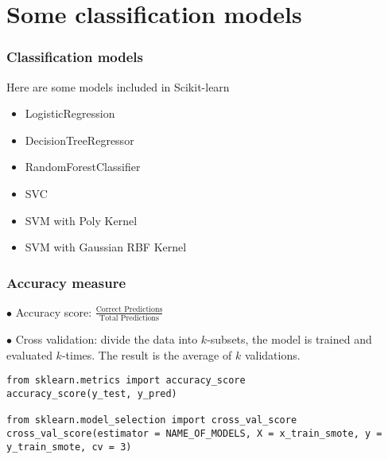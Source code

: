 \documentclass[10pt]{beamer}
\theoremstyle{definition}
\theoremstyle{remark}
\numberwithin{equation}{section}
\begin{document}
\section{Some classification models}
\begin{frame}
\frametitle{Classification models}

Here are some models included in Scikit-learn

\begin{itemize}
	\item LogisticRegression
	
	\item DecisionTreeRegressor
	
	\item RandomForestClassifier
	
	\item SVC
	
	\item SVM with Poly Kernel
	
	\item SVM with Gaussian RBF Kernel
\end{itemize}
\end{frame}

\begin{frame}[fragile]
	\frametitle{Accuracy measure}
	
	$\bullet$ Accuracy score: $\frac{\text{Correct Predictions}}{\text{Total Predictions}}$
	
	$\bullet$ Cross validation: divide the data into $k$-subsets, the model is trained and evaluated $k$-times. The result is the average of $k$ validations.
	\begin{lstlisting}
from sklearn.metrics import accuracy_score
accuracy_score(y_test, y_pred)

from sklearn.model_selection import cross_val_score
cross_val_score(estimator = NAME_OF_MODELS, X = x_train_smote, y = y_train_smote, cv = 3) 
	\end{lstlisting}
\end{frame}
\end{document}
